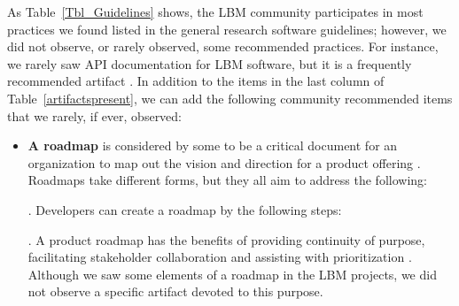 \documentclass[final, 3p, times, authoryear]{elsarticle}
\begin{document}
As Table~\ref{Tbl_Guidelines} shows, the LBM community participates in most
practices we found listed in the general research software guidelines; however,
we did not observe, or rarely observed, some recommended practices. For
instance, we rarely saw API documentation for LBM software, but it is a
frequently recommended artifact \citep{SmithAndRoscoe2018, ThielEtAl2020,
vanGompelEtAl2016, OrvizEtAl2017, SSI2022, Zadka2018}.  In addition to the items
in the last column of Table~\ref{artifactspresent}, we can add the following
community recommended items that we rarely, if ever, observed:

\begin{itemize}

\item \textbf{A roadmap} is considered by some to be a critical document for an
organization to map out the vision and direction for a product offering
\citep{MunchEtAl2019}.  Roadmaps take different forms, but they all aim to
address the following:  \citep{PhaalEtAl2005}.
Developers can create a roadmap by the following steps:
 \citep{VahaniittyEtAl2002}.  A product
roadmap has the benefits of providing continuity of purpose, facilitating
stakeholder collaboration and assisting with prioritization \citep{Pichler2012}.
Although we saw some elements of a roadmap in the LBM projects, we did not
observe a specific artifact devoted to this purpose.


\end{itemize}
\end{document}

